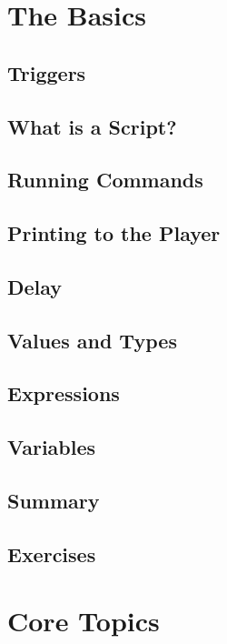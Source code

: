\documentclass[oneside]{book}
\begin{document}
\chapter{The Basics}

\section{Triggers}
\blindtext

\section{What is a Script?}
\blindtext

\section{Running Commands}
\blindtext

\section{Printing to the Player}
\blindtext

\section{Delay}
\blindtext

\section{Values and Types}
\blindtext

\section{Expressions}
\blindtext

\section{Variables}
\blindtext

\section{Summary}
\blindtext

\section{Exercises}
\blindtext

\chapter{Core Topics}
\blindtext
\end{document}
